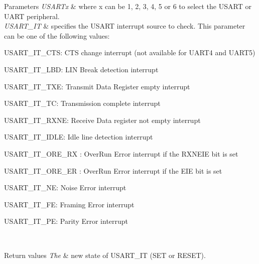 \begin{DoxyParams}{Parameters}
{\em U\+S\+A\+R\+Tx} & where x can be 1, 2, 3, 4, 5 or 6 to select the U\+S\+A\+RT or U\+A\+RT peripheral. \\
\hline
{\em U\+S\+A\+R\+T\+\_\+\+IT} & specifies the U\+S\+A\+RT interrupt source to check. This parameter can be one of the following values\+: \begin{DoxyItemize}
\item U\+S\+A\+R\+T\+\_\+\+I\+T\+\_\+\+C\+TS\+: C\+TS change interrupt (not available for U\+A\+R\+T4 and U\+A\+R\+T5) \item U\+S\+A\+R\+T\+\_\+\+I\+T\+\_\+\+L\+BD\+: L\+IN Break detection interrupt \item U\+S\+A\+R\+T\+\_\+\+I\+T\+\_\+\+T\+XE\+: Transmit Data Register empty interrupt \item U\+S\+A\+R\+T\+\_\+\+I\+T\+\_\+\+TC\+: Transmission complete interrupt \item U\+S\+A\+R\+T\+\_\+\+I\+T\+\_\+\+R\+X\+NE\+: Receive Data register not empty interrupt \item U\+S\+A\+R\+T\+\_\+\+I\+T\+\_\+\+I\+D\+LE\+: Idle line detection interrupt \item U\+S\+A\+R\+T\+\_\+\+I\+T\+\_\+\+O\+R\+E\+\_\+\+RX \+: Over\+Run Error interrupt if the R\+X\+N\+E\+IE bit is set \item U\+S\+A\+R\+T\+\_\+\+I\+T\+\_\+\+O\+R\+E\+\_\+\+ER \+: Over\+Run Error interrupt if the E\+IE bit is set \item U\+S\+A\+R\+T\+\_\+\+I\+T\+\_\+\+NE\+: Noise Error interrupt \item U\+S\+A\+R\+T\+\_\+\+I\+T\+\_\+\+FE\+: Framing Error interrupt \item U\+S\+A\+R\+T\+\_\+\+I\+T\+\_\+\+PE\+: Parity Error interrupt \end{DoxyItemize}
\\
\hline
\end{DoxyParams}

\begin{DoxyRetVals}{Return values}
{\em The} & new state of U\+S\+A\+R\+T\+\_\+\+IT (S\+ET or R\+E\+S\+ET). \\
\hline
\end{DoxyRetVals}
